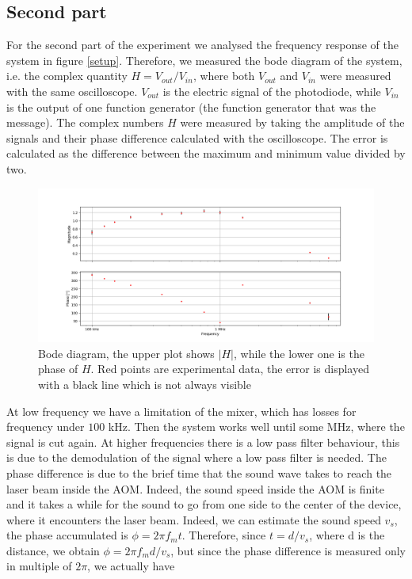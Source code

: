 \documentclass[a4paper,10pt]{article}
\begin{document}
\subsection{Second part}
For the second part of the experiment we analysed the frequency response of the system in figure \ref{setup}. Therefore, we measured the bode diagram of the system, i.e. the complex quantity $H = V_{out}/V_{in}$, where both $V_{out}$ and $V_{in}$ were measured with the same oscilloscope. $V_{out}$ is the electric signal of the photodiode, while $V_{in}$ is the output of one function generator (the function generator that was the message). The complex numbers $H$ were measured by taking the amplitude of the signals and their phase difference calculated with the oscilloscope. The error is calculated as the difference between the maximum and minimum value divided by two.
\begin{figure}[H]
\centering
\includegraphics[width=\textwidth]{bode}
\caption{Bode diagram, the upper plot shows $|H|$, while the lower one is the phase of $H$. Red points are experimental data, the error is displayed with a black line which is not always visible}\label{bode}
\end{figure}
At low frequency we have a limitation of the mixer, which has losses for frequency under $100$ kHz. Then the system works well until some MHz, where the signal is cut again. At higher frequencies there is a low pass filter behaviour, this is due to the demodulation of the signal where a low pass filter is needed.
The phase difference is due to the brief time that the sound wave takes to reach the laser beam inside the AOM. Indeed, the sound speed inside the AOM is finite and it takes a while for the sound to go from one side to the center of the device, where it encounters the laser beam. Indeed, we can estimate the sound speed $v_s$, the phase accumulated is $\phi = 2\pi f_m t$. Therefore, since $t = d/v_s$, where d is the distance, we obtain $\phi = 2\pi f_m d/v_s$, but since the phase difference is measured only in multiple of $2\pi$, we actually have
\end{document}
